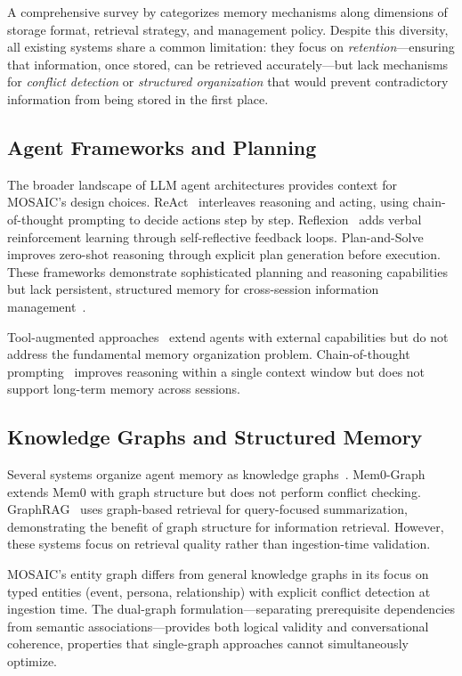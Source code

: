\documentclass[10pt,twocolumn]{article}
\begin{document}
A comprehensive survey by \citet{zhang2025survey} categorizes memory
mechanisms along dimensions of storage format, retrieval strategy, and
management policy. Despite this diversity, all existing systems share a common
limitation: they focus on \emph{retention}---ensuring that information, once
stored, can be retrieved accurately---but lack mechanisms for \emph{conflict
detection} or \emph{structured organization} that would prevent contradictory
information from being stored in the first place.

\subsection{Agent Frameworks and Planning}

The broader landscape of LLM agent architectures provides context for
MOSAIC's design choices. ReAct~\citep{yao2022react} interleaves reasoning
and acting, using chain-of-thought prompting to decide actions step by step.
Reflexion~\citep{shinn2023reflexion} adds verbal reinforcement learning
through self-reflective feedback loops. Plan-and-Solve~\citep{wang2023plan}
improves zero-shot reasoning through explicit plan generation before
execution. These frameworks demonstrate sophisticated planning and reasoning
capabilities but lack persistent, structured memory for cross-session
information management~\citep{xi2025rise, wang2024survey}.

Tool-augmented approaches~\citep{schick2023toolformer} extend agents with
external capabilities but do not address the fundamental memory organization
problem. Chain-of-thought prompting~\citep{wei2022chain} improves reasoning
within a single context window but does not support long-term memory across
sessions.

\subsection{Knowledge Graphs and Structured Memory}

Several systems organize agent memory as knowledge
graphs~\citep{pan2024unifying}. Mem0-Graph extends Mem0 with graph
structure but does not perform conflict checking. GraphRAG~\citep{edge2024local}
uses graph-based retrieval for query-focused summarization, demonstrating the
benefit of graph structure for information retrieval. However, these systems
focus on retrieval quality rather than ingestion-time validation.

MOSAIC's entity graph differs from general knowledge graphs in its focus on
typed entities (event, persona, relationship) with explicit conflict detection
at ingestion time. The dual-graph formulation---separating prerequisite
dependencies from semantic associations---provides both logical validity and
conversational coherence, properties that single-graph approaches cannot
simultaneously optimize.
\end{document}
